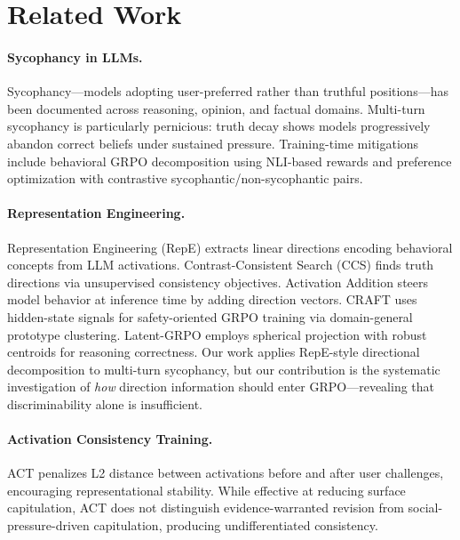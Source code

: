 \documentclass[11pt,a4paper]{article}
\begin{document}
\section{Related Work}

\paragraph{Sycophancy in LLMs.}
Sycophancy---models adopting user-preferred rather than truthful positions---has been documented across reasoning, opinion, and factual domains.
Multi-turn sycophancy is particularly pernicious: truth decay shows models progressively abandon correct beliefs under sustained pressure.
Training-time mitigations include behavioral GRPO decomposition using NLI-based rewards and preference optimization with contrastive sycophantic/non-sycophantic pairs.

\paragraph{Representation Engineering.}
Representation Engineering (RepE) extracts linear directions encoding behavioral concepts from LLM activations.
Contrast-Consistent Search (CCS) finds truth directions via unsupervised consistency objectives.
Activation Addition steers model behavior at inference time by adding direction vectors.
CRAFT uses hidden-state signals for safety-oriented GRPO training via domain-general prototype clustering.
Latent-GRPO employs spherical projection with robust centroids for reasoning correctness.
Our work applies RepE-style directional decomposition to multi-turn sycophancy, but our contribution is the systematic investigation of \emph{how} direction information should enter GRPO---revealing that discriminability alone is insufficient.

\paragraph{Activation Consistency Training.}
ACT penalizes L2 distance between activations before and after user challenges, encouraging representational stability.
While effective at reducing surface capitulation, ACT does not distinguish evidence-warranted revision from social-pressure-driven capitulation, producing undifferentiated consistency.

\end{document}
